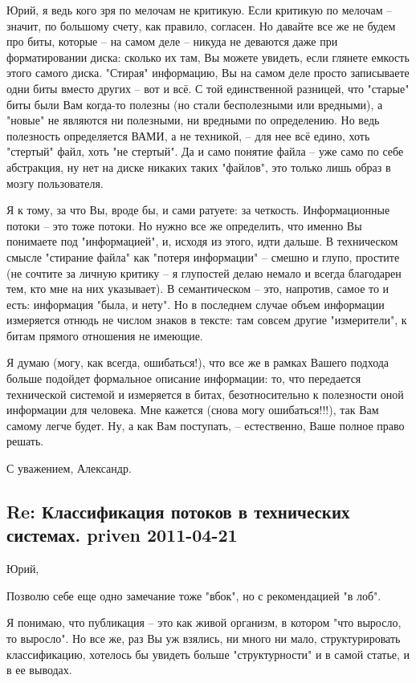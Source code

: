 \documentclass[a4paper,11pt]{article}
\begin{document}
Юрий, я ведь кого зря по мелочам не критикую. Если критикую по мелочам --
значит, по большому счету, как правило, согласен. Но давайте все же не будем
про биты, которые -- на самом деле -- никуда не деваются даже при
форматировании диска: сколько их там, Вы можете увидеть, если глянете емкость
этого самого диска. "Стирая" информацию, Вы на самом деле просто записываете
одни биты вместо других -- вот и всё. С той единственной разницей, что
"старые" биты были Вам когда-то полезны (но стали бесполезными или вредными),
а "новые" не являются ни полезными, ни вредными по определению. Но ведь
полезность определяется ВАМИ, а не техникой, -- для нее всё едино, хоть
"стертый" файл, хоть "не стертый". Да и само понятие файла -- уже само по себе
абстракция, ну нет на диске никаких таких "файлов", это только лишь образ в
мозгу пользователя.

Я к тому, за что Вы, вроде бы, и сами ратуете: за четкость. Информационные
потоки -- это тоже потоки. Но нужно все же определить, что именно Вы понимаете
под "информацией", и, исходя из этого, идти дальше. В техническом смысле
"стирание файла" как "потеря информации" -- смешно и глупо, простите (не
сочтите за личную критику -- я глупостей делаю немало и всегда благодарен тем,
кто мне на них указывает). В семантическом -- это, напротив, самое то и есть:
информация "была, и нету". Но в последнем случае объем информации измеряется
отнюдь не числом знаков в тексте: там совсем другие "измерители", к битам
прямого отношения не имеющие.

Я думаю (могу, как всегда, ошибаться!), что все же в рамках Вашего подхода
больше подойдет формальное описание информации: то, что передается технической
системой и измеряется в битах, безотносительно к полезности оной информации
для человека. Мне кажется (снова могу ошибаться!!!), так Вам самому легче
будет.  Ну, а как Вам поступать, -- естественно, Ваше полное право решать.

С уважением, Александр.

\subsection*{Re: Классификация потоков в технических системах. priven
  2011-04-21} 

Юрий,

Позволю себе еще одно замечание тоже "вбок", но с рекомендацией "в лоб".

Я понимаю, что публикация -- это как живой организм, в котором "что выросло,
то выросло". Но все же, раз Вы уж взялись, ни много ни мало, структурировать
классификацию, хотелось бы увидеть больше "структурности" и в самой статье, и
в ее выводах.
\end{document}
